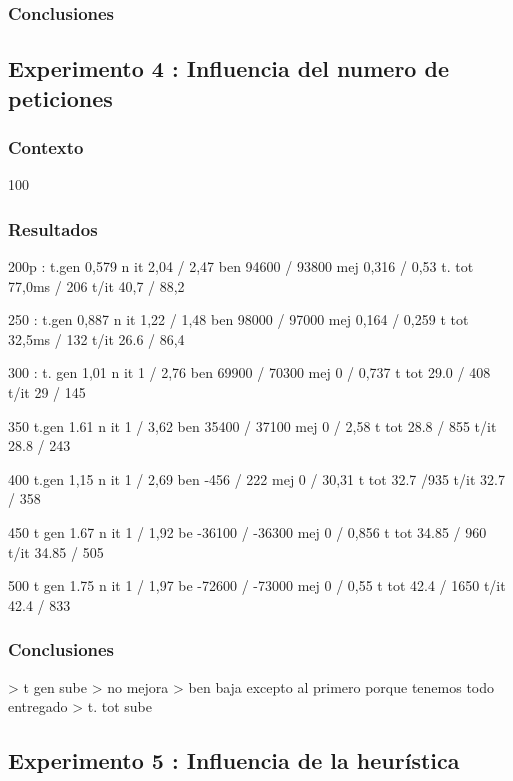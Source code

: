 \documentclass{article}
\begin{document}
\subsubsection{Conclusiones}

\subsection{Experimento 4 : Influencia del numero de peticiones}

\subsubsection{Contexto}
100

\subsubsection{Resultados}
200p : 
t.gen 0,579
n it 2,04 / 2,47
ben 94600 / 93800
mej 0,316 / 0,53
t. tot 77,0ms / 206
t/it 40,7 / 88,2

250 :
t.gen 0,887
n it 1,22 / 1,48
ben 98000 / 97000
mej 0,164 / 0,259
t tot 32,5ms / 132
t/it 26.6 / 86,4

300 :
t. gen 1,01
n it 1 / 2,76
ben 69900 / 70300
mej 0 / 0,737
t tot 29.0 / 408
t/it 29 / 145

350
t.gen 1.61
n it 1 / 3,62
ben 35400 / 37100
mej 0 / 2,58
t tot 28.8 / 855
t/it 28.8 / 243

400
t.gen 1,15
n it 1 / 2,69
ben -456 / 222
mej 0 / 30,31
t tot 32.7 /935
t/it 32.7 / 358

450
t gen 1.67
n it 1 / 1,92
be -36100 / -36300
mej 0 / 0,856
t tot 34.85 / 960
t/it 34.85 / 505

500
t gen 1.75
n it 1 / 1,97
be -72600 / -73000
mej 0 / 0,55
t tot 42.4 / 1650
t/it 42.4 / 833

\subsubsection{Conclusiones}
> t gen sube
> no mejora
> ben baja excepto al primero porque tenemos todo entregado
> t. tot sube 

\subsection{Experimento 5 : Influencia de la heurística}

\end{document}
